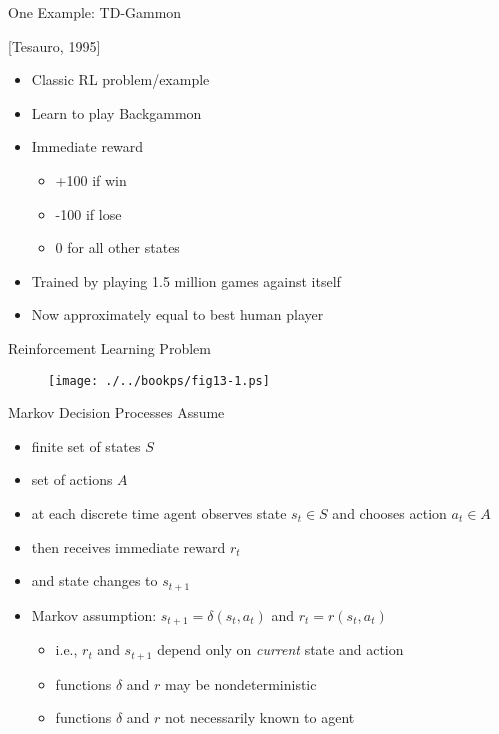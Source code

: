 \documentclass[%
pdf,
colorBG,
slideColor,
tcrico,
]{prosper}
\begin{document}
\begin{slide}{One Example: TD-Gammon } 

\centerline{[Tesauro, 1995]}

\begin{itemize}
 \item Classic RL problem/example
 \item Learn to play Backgammon
 \item Immediate reward
  \begin{itemize}
  \item +100 if win
  \item -100 if lose
  \item 0 for all other states
  \end{itemize}
\item Trained by playing 1.5 million games against itself
\item Now approximately equal to best human player
\end{itemize}
\end{slide}

\begin{slide}{\large Reinforcement Learning Problem } 

	\begin{figure}
		\centering
		\texttt{[image: ./../bookps/fig13-1.ps]}
	\end{figure}

\end{slide}



\begin{slide}{Markov Decision Processes } 
\tiny
Assume
\begin{itemize}
\item  finite set of states $S$
\item  set of actions $A$
\item at each discrete time agent observes state $s_t \in S$ and chooses
action $a_t \in A$
\item then receives immediate reward $r_t$
\item and state changes to $s_{t+1}$
\item Markov assumption:  $s_{t+1} = \delta(s_t, a_t)$ and  $r_t = r(s_t,
a_t)$ 
\begin{itemize}
\item i.e., $r_t$ and $s_{t+1}$ depend only on {\em current} state and action
\item functions $\delta$ and $r$ may be nondeterministic
\item functions $\delta$ and $r$ not necessarily known to agent
\end{itemize}
\end{itemize}
\end{slide}
\end{document}
